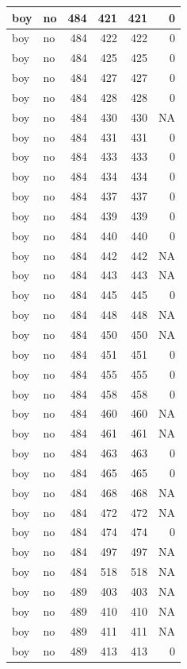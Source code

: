 \documentclass[man]{apa6}
\begin{document}
\begin{tabular}{l|l|r|r|r|r}
\hline
boy & no & 484 & 421 & 421 & 0\\
\hline
boy & no & 484 & 422 & 422 & 0\\
\hline
boy & no & 484 & 425 & 425 & 0\\
\hline
boy & no & 484 & 427 & 427 & 0\\
\hline
boy & no & 484 & 428 & 428 & 0\\
\hline
boy & no & 484 & 430 & 430 & NA\\
\hline
boy & no & 484 & 431 & 431 & 0\\
\hline
boy & no & 484 & 433 & 433 & 0\\
\hline
boy & no & 484 & 434 & 434 & 0\\
\hline
boy & no & 484 & 437 & 437 & 0\\
\hline
boy & no & 484 & 439 & 439 & 0\\
\hline
boy & no & 484 & 440 & 440 & 0\\
\hline
boy & no & 484 & 442 & 442 & NA\\
\hline
boy & no & 484 & 443 & 443 & NA\\
\hline
boy & no & 484 & 445 & 445 & 0\\
\hline
boy & no & 484 & 448 & 448 & NA\\
\hline
boy & no & 484 & 450 & 450 & NA\\
\hline
boy & no & 484 & 451 & 451 & 0\\
\hline
boy & no & 484 & 455 & 455 & 0\\
\hline
boy & no & 484 & 458 & 458 & 0\\
\hline
boy & no & 484 & 460 & 460 & NA\\
\hline
boy & no & 484 & 461 & 461 & NA\\
\hline
boy & no & 484 & 463 & 463 & 0\\
\hline
boy & no & 484 & 465 & 465 & 0\\
\hline
boy & no & 484 & 468 & 468 & NA\\
\hline
boy & no & 484 & 472 & 472 & NA\\
\hline
boy & no & 484 & 474 & 474 & 0\\
\hline
boy & no & 484 & 497 & 497 & NA\\
\hline
boy & no & 484 & 518 & 518 & NA\\
\hline
boy & no & 489 & 403 & 403 & NA\\
\hline
boy & no & 489 & 410 & 410 & NA\\
\hline
boy & no & 489 & 411 & 411 & NA\\
\hline
boy & no & 489 & 413 & 413 & 0\\

\end{tabular}
\end{document}
